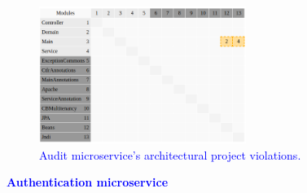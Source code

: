 \documentclass[12pt]{article}
\begin{document}
\begin{figure}[ht]
\centering
\includegraphics[width=0.6\textwidth]{figuras/violacoesAudit.png}
\caption{\textcolor{blue}{Audit microservice's architectural project violations.}}
\label{fig:microservices}
\end{figure}
\newpage
\noindent\textbf{\textcolor{blue}{Authentication microservice}}
\label{sec:ApendiceAuthentication}
\end{document}
